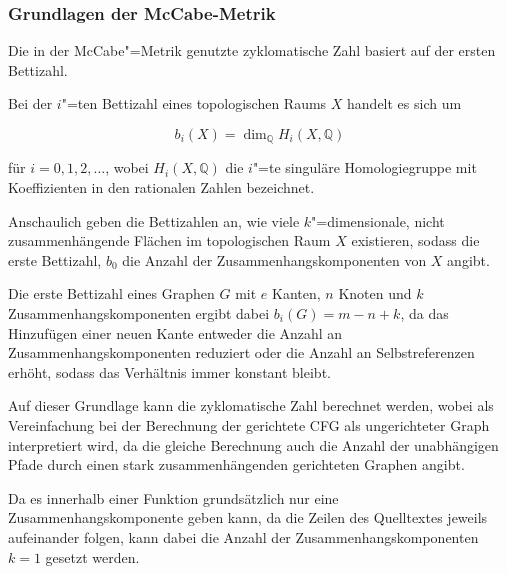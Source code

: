             \subsubsection{Grundlagen der McCabe-Metrik}
                Die in der McCabe"=Metrik genutzte zyklomatische Zahl basiert auf der ersten Bettizahl.

                Bei der
                \( i \)"=ten Bettizahl eines topologischen Raums
                \( X \) handelt es sich um

                \[ b_i(X) = \dim_\mathbb{Q} H_i(X, \mathbb{Q}) \]

                für
                \( i = 0, 1, 2, \dots \),
                wobei
                \( H_i(X, \mathbb{Q}) \) die \( i \)"=te singuläre Homologiegruppe mit Koeffizienten in den rationalen Zahlen bezeichnet.\cite{Academic2015}

                Anschaulich geben die Bettizahlen an,
                wie viele
                \( k \)"=dimensionale,
                nicht zusammenhängende Flächen im topologischen Raum
                \( X \) existieren,
                sodass die erste Bettizahl,
                \( b_0 \) die Anzahl der Zusammenhangskomponenten von
                \( X \) angibt.\cite{Academic2015}

                Die erste Bettizahl eines Graphen
                \( G \) mit
                \( e \) Kanten,
                \( n \) Knoten und
                \( k \) Zusammenhangskomponenten
                ergibt dabei
                \( b_i(G) = m - n + k \),
                da das Hinzufügen einer neuen Kante entweder die Anzahl an Zusammenhangskomponenten reduziert oder
                die Anzahl an Selbstreferenzen erhöht,
                sodass das Verhältnis immer konstant bleibt.\cite{ProjectCodeMeter2014}

                Auf dieser Grundlage kann die zyklomatische Zahl berechnet werden,
                wobei als Vereinfachung bei der Berechnung der gerichtete
                \gls{CFG} als ungerichteter Graph interpretiert wird,
                da die gleiche Berechnung auch die Anzahl der unabhängigen Pfade durch einen stark zusammenhängenden gerichteten Graphen angibt.\cite[20]{Watson1996}

                Da es innerhalb einer Funktion grundsätzlich nur eine Zusammenhangskomponente geben kann,
                da die Zeilen des Quelltextes jeweils aufeinander folgen,
                kann dabei die Anzahl der Zusammenhangskomponenten
                \( k = 1 \) gesetzt werden.


